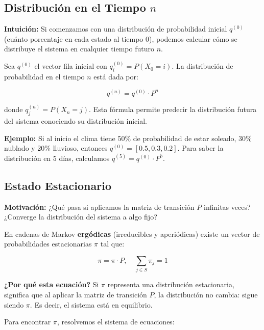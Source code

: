 \documentclass[a4paper,11pt]{article}
\begin{document}
\subsection{Distribución en el Tiempo $n$}

\textbf{Intuición:} Si comenzamos con una distribución de probabilidad inicial $q^{(0)}$ (cuánto porcentaje en cada estado al tiempo 0), podemos calcular cómo se distribuye el sistema en cualquier tiempo futuro $n$.

\vspace{0.5em}

Sea $q^{(0)}$ el vector fila inicial con $q^{(0)}_i = P(X_0 = i)$. La distribución de probabilidad en el tiempo $n$ está dada por:

\[q^{(n)} = q^{(0)} \cdot P^n\]

donde $q^{(n)}_j = P(X_n = j)$. Esta fórmula permite predecir la distribución futura del sistema conociendo su distribución inicial.

\vspace{0.5em}

\textbf{Ejemplo:} Si al inicio el clima tiene 50\% de probabilidad de estar soleado, 30\% nublado y 20\% lluvioso, entonces $q^{(0)} = [0.5, 0.3, 0.2]$. Para saber la distribución en 5 días, calculamos $q^{(5)} = q^{(0)} \cdot P^5$.

\subsection{Estado Estacionario}

\textbf{Motivación:} ¿Qué pasa si aplicamos la matriz de transición $P$ infinitas veces? ¿Converge la distribución del sistema a algo fijo?

\vspace{0.5em}

En cadenas de Markov \textbf{ergódicas} (irreducibles y aperiódicas) existe un vector de probabilidades estacionarias $\pi$ tal que:

\[\pi = \pi \cdot P, \quad \sum_{j \in S} \pi_j = 1\]

\textbf{¿Por qué esta ecuación?} Si $\pi$ representa una distribución estacionaria, significa que al aplicar la matriz de transición $P$, la distribución no cambia: sigue siendo $\pi$. Es decir, el sistema está en equilibrio.

\vspace{0.5em}

Para encontrar $\pi$, resolvemos el sistema de ecuaciones:
\end{document}
